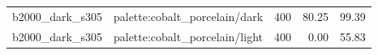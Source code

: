 \begin{longtable}{l>{\raggedright\arraybackslash}p{.42\linewidth}rrr}
b2000\_\allowbreak{}dark\_\allowbreak{}s305 & %
palette:cobalt\_\allowbreak{}porcelain/dark & %
400 & %
80.25 & %
99.39 \\ %

b2000\_\allowbreak{}dark\_\allowbreak{}s305 & %
palette:cobalt\_\allowbreak{}porcelain/light & %
400 & %
0.00 & %
55.83 \\ %


\end{longtable}
